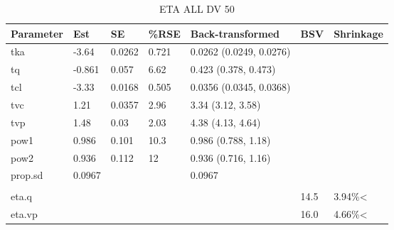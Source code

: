 \begin{table}
\centering\centering
\caption{ETA ALL DV 50}
\centering
\fontsize{8}{10}\selectfont
\begin{tabular}[t]{lllllll}
\toprule
\textbf{Parameter} & \textbf{Est} & \textbf{SE} & \textbf{\%RSE} & \textbf{Back-transformed} & \textbf{BSV} & \textbf{Shrinkage}\\
\midrule
tka & -3.64 & 0.0262 & 0.721 & 0.0262 (0.0249, 0.0276) &  & \\
\midrule
tq & -0.861 & 0.057 & 6.62 & 0.423 (0.378, 0.473) &  & \\
\midrule
tcl & -3.33 & 0.0168 & 0.505 & 0.0356 (0.0345, 0.0368) &  & \\
\midrule
tvc & 1.21 & 0.0357 & 2.96 & 3.34 (3.12, 3.58) &  & \\
\midrule
tvp & 1.48 & 0.03 & 2.03 & 4.38 (4.13, 4.64) &  & \\
\midrule
pow1 & 0.986 & 0.101 & 10.3 & 0.986 (0.788, 1.18) &  & \\
\midrule
pow2 & 0.936 & 0.112 & 12 & 0.936 (0.716, 1.16) &  & \\
\midrule
prop.sd & 0.0967 &  &  & 0.0967 &  & \\
\midrule\\
eta.q &  &  &  &  & 14.5 & 3.94\%<\\
\midrule
eta.vp &  &  &  &  & 16.0 & 4.66\%<\\
\bottomrule
\end{tabular}
\end{table}